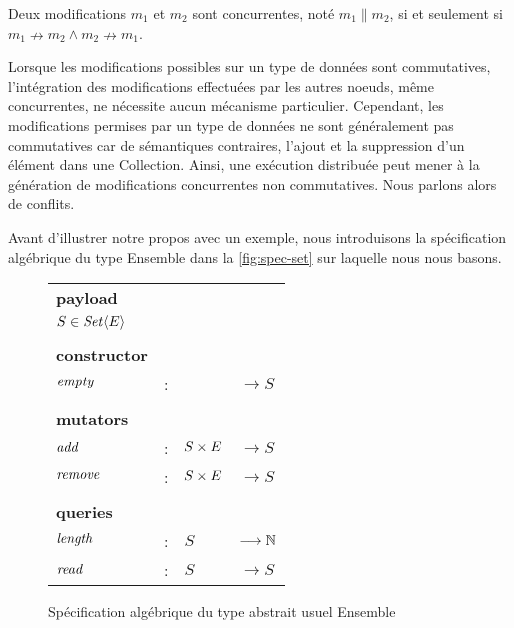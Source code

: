 \begin{definition}[Concurrence]
  Deux modifications $m_1$ et $m_2$ sont concurrentes, noté $m_1 \parallel m_2$, si et seulement si $m_1 \nrightarrow m_2 \land m_2 \nrightarrow m_1$.
\end{definition}

Lorsque les modifications possibles sur un type de données sont commutatives, l'intégration des modifications effectuées par les autres noeuds, même concurrentes, ne nécessite aucun mécanisme particulier.
Cependant, les modifications permises par un type de données ne sont généralement pas commutatives car de sémantiques contraires, \eg l'ajout et la suppression d'un élément dans une Collection.
Ainsi, une exécution distribuée peut mener à la génération de modifications concurrentes non commutatives.
Nous parlons alors de conflits.

Avant d'illustrer notre propos avec un exemple, nous introduisons la spécification algébrique du type Ensemble dans la \autoref{fig:spec-set} sur laquelle nous nous basons.

\begin{figure}[!ht]

  \centering
    \begin{tabular}{llll}
      \textbf{payload} \\
      $S \in \mathit{Set}\langle E \rangle$ & & & \\
      \\
      \textbf{constructor} \\
      $\mathit{empty}$ & : &                       & $\longrightarrow S$   \\
      \\
      \textbf{mutators} \\
      $\mathit{add}$ & : & $S \times E$ & $\longrightarrow S$   \\
      $\mathit{remove}$ & : & $S \times E$          & $\longrightarrow S$   \\
      \\
      \textbf{queries} \\
      $\mathit{length}$ & : & $S$                   & $\longrightarrow \mathbb{N}$   \\
      $\mathit{read}$  & : & $S$                   & $\longrightarrow S$ \\
    \end{tabular}
  \caption{Spécification algébrique du type abstrait usuel Ensemble}
  \label{fig:spec-set}
\end{figure}

